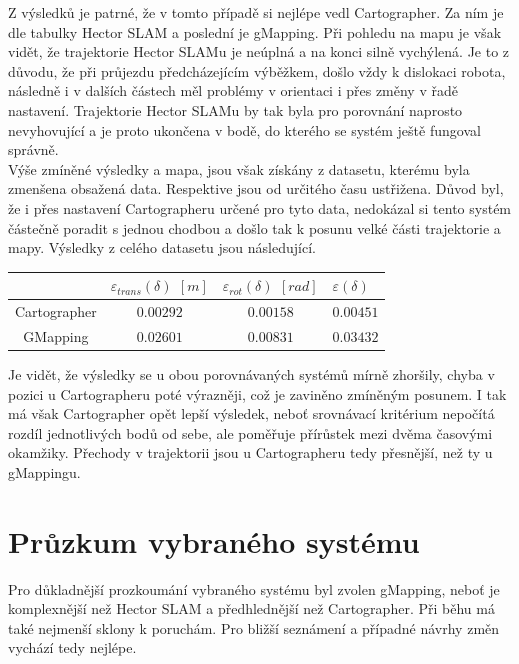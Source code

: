\documentclass[12pt]{article}
\begin{document}
Z výsledků je patrné, že v tomto případě si nejlépe vedl Cartographer. Za ním je dle tabulky Hector SLAM a poslední je gMapping. Při pohledu na mapu je však vidět, že trajektorie Hector SLAMu je neúplná a na konci silně vychýlená. Je to z důvodu, že při průjezdu předcházejícím výběžkem, došlo vždy k dislokaci robota, následně i v dalších částech měl problémy v orientaci i přes změny v řadě nastavení. Trajektorie Hector SLAMu by tak byla pro porovnání naprosto nevyhovující a je proto ukončena v bodě, do kterého se systém ještě fungoval správně.\\
\indent Výše zmíněné výsledky a mapa, jsou však získány z datasetu, kterému byla zmenšena obsažená data. Respektive jsou od určitého času ustřižena. Důvod byl, že i přes nastavení Cartographeru určené pro tyto data, nedokázal si tento systém částečně poradit s jednou chodbou a došlo tak k posunu velké části trajektorie a mapy. Výsledky z celého datasetu jsou následující.\\
\begin{center}
	\begin{tabular}{c|ccp{3cm}}
		\bfseries \bfseries  & $\varepsilon_{trans}(\delta)$ $[m]$ & $\varepsilon_{rot}(\delta)$ $[rad]$ & $\varepsilon(\delta)$ \\ [2mm]
		\hline
		Cartographer & $0.00292$ & $0.00158$ & $0.00451$ \\
		GMapping & $0.02601$ & $0.00831$ & $0.03432$ \\ 
	\end{tabular}
\end{center}

Je vidět, že výsledky se u obou porovnávaných systémů mírně zhoršily, chyba v pozici u Cartographeru poté výrazněji, což je zaviněno zmíněným posunem. I tak má však Cartographer opět lepší výsledek, neboť srovnávací kritérium nepočítá rozdíl jednotlivých bodů od sebe, ale poměřuje přírůstek mezi dvěma časovými okamžiky. Přechody v trajektorii jsou u Cartographeru tedy přesnější, než ty u gMappingu. 

\section{Průzkum vybraného systému}
Pro důkladnější prozkoumání vybraného systému byl zvolen gMapping, neboť je komplexnější než Hector SLAM a předhlednější než Cartographer. Při běhu má také nejmenší sklony k poruchám. Pro bližší seznámení a případné návrhy změn vychází tedy nejlépe.
\end{document}
